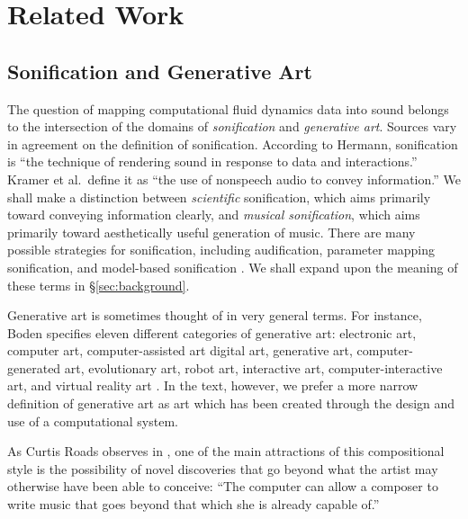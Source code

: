 \chapter[Related Work]{Related Work}
\label{chap:chap2}
\section{Sonification and Generative Art}

The question of mapping computational fluid dynamics data into sound belongs 
to the intersection of the domains of {\em sonification} and {\em generative 
art}. Sources vary in agreement on the definition of sonification. According 
to Hermann, sonification is ``the technique of rendering sound in response to 
data and interactions.'' \cite{hermann2011sonification} Kramer et al.~define 
it as ``the use of nonspeech audio to convey information.'' \cite{kramer2010sonification} 
We shall make a distinction between {\em scientific} 
sonification, which aims primarily toward conveying information clearly, and {
\em musical sonification}, which aims primarily toward aesthetically useful 
generation of music. There are many possible strategies for sonification, 
including audification, parameter mapping sonification, and model-based 
sonification \cite{hermann2011sonification}. We shall expand upon the meaning 
of these terms in \S\ref{sec:background}.

Generative art is sometimes thought of in very general terms. For instance, 
Boden specifies eleven different categories of generative art: electronic 
art, computer art, computer-assisted art digital art, generative art, computer-generated art, evolutionary art, robot art, interactive art, computer-interactive art, and virtual reality art \cite{boden2009generative}. In the 
text, however, we prefer a more narrow definition of generative art as art 
which has been created through the design and use of a computational system.

As Curtis Roads observes in \cite{roads2015composing}, one of the main attractions of this compositional style is the possibility of 
novel discoveries that go beyond what the artist may otherwise have been able 
to conceive: ``The computer can allow a composer to write music that goes 
beyond that which she is already capable of.'' 

